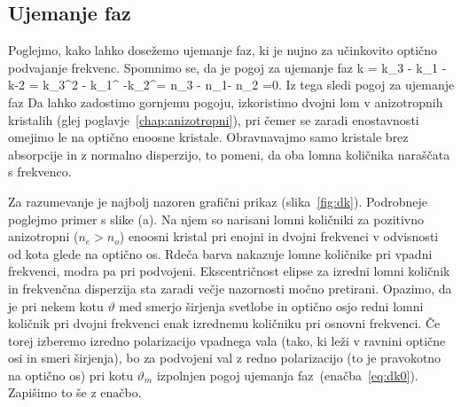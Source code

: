 
\subsection*{Ujemanje faz}
Poglejmo, kako lahko dosežemo ujemanje faz, ki je nujno za učinkovito optično
podvajanje frekvenc. Spomnimo se, da je pogoj za ujemanje faz 
\beq
\Delta k = k_3 - k_1 -k-2 = k_3^{2\omega} - k_1^{\omega} -k_2^\omega = 
 n_3 -  n_1-  n_2 =0.
\eeq
Iz tega sledi pogoj za ujemanje faz
Da lahko zadostimo gornjemu pogoju, izkoristimo dvojni lom v anizotropnih kristalih
(glej poglavje~\ref{chap:anizotropni}), pri čemer se zaradi enostavnosti omejimo le na optično 
enoosne kristale. Obravnavajmo samo kristale brez absorpcije in z normalno disperzijo, 
to pomeni, da oba lomna količnika naraščata s frekvenco.  

Za razumevanje je najbolj nazoren grafični prikaz (slika~\ref{fig:dk}). 
Podrobneje poglejmo primer s slike (a). Na njem so narisani lomni količniki za pozitivno
anizotropni ($n_e>n_o$) enoosni kristal pri enojni in dvojni
frekvenci v odvisnosti od kota glede na optično os. Rdeča barva nakazuje lomne količnike
pri vpadni frekvenci, modra pa pri podvojeni. Ekscentričnost elipse za 
izredni lomni količnik in frekvenčna disperzija sta zaradi večje nazornosti močno 
pretirani. Opazimo, da je pri nekem kotu $\vartheta$ med smerjo širjenja svetlobe in optično 
osjo redni lomni količnik pri dvojni frekvenci enak izrednemu količniku pri osnovni
frekvenci. Če torej izberemo izredno polarizacijo vpadnega vala (tako, ki leži
v ravnini optične osi in smeri širjenja), bo za podvojeni val z redno
polarizacijo (to je pravokotno na optično os) pri kotu
$\vartheta_m$ izpolnjen pogoj ujemanja faz~(enačba~\ref{eq:dk0}). Zapišimo to še z enačbo.

